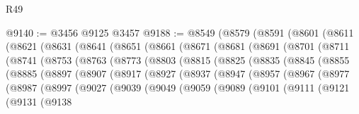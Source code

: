 \begin{lexlean}{R49}
\begin{coremodule}
@9140 := @3456 @9125 @3457
@9188 := @8549
    (@8579
      (@8591
        (@8601
          (@8611
            (@8621
              (@8631
                (@8641
                  (@8651
                    (@8661
                      (@8671
                        (@8681
                          (@8691
                            (@8701
                              (@8711
                                (@8741
                                  (@8753
                                    (@8763
                                      (@8773
                                        (@8803
                                          (@8815
                                            (@8825
                                              (@8835
                                                (@8845
                                                  (@8855
                                                    (@8885
                                                      (@8897
                                                        (@8907
                                                          (@8917
                                                            (@8927
                                                              (@8937
                                                                (@8947
                                                                  (@8957
                                                                    (@8967
                                                                      (@8977
                                                                        (@8987
                                                                          (@8997
                                                                            (@9027
                                                                              (@9039
                                                                                (@9049
                                                                                  (@9059
                                                                                    (@9089
                                                                                      (@9101
                                                                                        (@9111
                                                                                          (@9121
                                                                                            (@9131
                                                                                              (@9138

\end{coremodule}
\end{lexlean}
